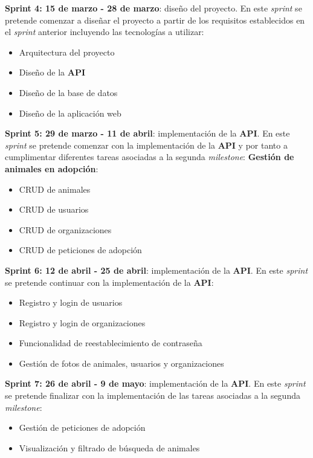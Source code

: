 \textbf{Sprint 4: 15 de marzo - 28 de marzo}: diseño del proyecto. En este \textit{sprint} se pretende comenzar a
diseñar el proyecto a partir de los requisitos establecidos en el \textit{sprint} anterior incluyendo las
tecnologías a utilizar:

\begin{itemize}
    \item Arquitectura del proyecto
    \item Diseño de la \textbf{API}
    \item Diseño de la base de datos
    \item Diseño de la aplicación web
\end{itemize}

\textbf{Sprint 5: 29 de marzo - 11 de abril}: implementación de la \textbf{API}. En este \textit{sprint} se pretende comenzar
con la implementación de la \textbf{API} y por tanto a cumplimentar diferentes tareas asociadas a la segunda \textit{milestone}:
\textbf{Gestión de animales en adopción}:

\begin{itemize}
    \item CRUD de animales
    \item CRUD de usuarios
    \item CRUD de organizaciones
    \item CRUD de peticiones de adopción
\end{itemize}

\textbf{Sprint 6: 12 de abril - 25 de abril}: implementación de la \textbf{API}. En este \textit{sprint} se pretende continuar
con la implementación de la \textbf{API}:

\begin{itemize}
    \item Registro y login de usuarios
    \item Registro y login de organizaciones
    \item Funcionalidad de reestablecimiento de contraseña
    \item Gestión de fotos de animales, usuarios y organizaciones
\end{itemize}

\textbf{Sprint 7: 26 de abril - 9 de mayo}: implementación de la \textbf{API}. En este \textit{sprint} se pretende finalizar
con la implementación de las tareas asociadas a la segunda \textit{milestone}:

\begin{itemize}
    \item Gestión de peticiones de adopción
    \item Visualización y filtrado de búsqueda de animales
\end{itemize}

